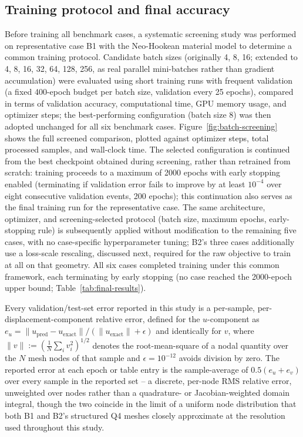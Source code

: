 \documentclass[final,5p,times]{elsarticle}
\begin{document}
\subsection{Training protocol and final accuracy}
Before training all benchmark cases, a systematic screening study was
performed on representative case B1 with the Neo-Hookean material model
to determine a common training protocol. Candidate batch sizes
(originally 4, 8, 16; extended to 4, 8, 16, 32, 64, 128, 256, as real
parallel mini-batches rather than gradient accumulation) were evaluated
using short training runs with frequent validation (a fixed 400-epoch
budget per batch size, validation every 25 epochs), compared in terms of
validation accuracy, computational time, GPU memory usage, and optimizer
steps; the best-performing configuration (batch size 8) was then adopted
unchanged for all six benchmark cases.
Figure~\ref{fig:batch-screening} shows the full screened comparison,
plotted against optimizer steps, total processed samples, and wall-clock
time. The selected configuration is continued from the best checkpoint
obtained during screening, rather than retrained from scratch: training
proceeds to a maximum of 2000 epochs with early stopping enabled
(terminating if validation error fails to improve by at least $10^{-4}$
over eight consecutive validation events, 200 epochs); this continuation
also serves as the final training run for the representative case. The
same architecture, optimizer, and screening-selected protocol (batch
size, maximum epochs, early-stopping rule) is subsequently applied
without modification to the remaining five cases, with no case-specific
hyperparameter tuning; B2's three cases additionally use a loss-scale
rescaling, discussed next, required for the raw objective to train at
all on that geometry. All six cases completed
training under this common framework, each terminating by early stopping
(no case reached the 2000-epoch upper bound; Table~\ref{tab:final-results}).

Every validation/test-set error reported in this study is a per-sample,
per-displacement-component relative error, defined for the $u$-component
as $e_u = \|u_{\text{pred}}-u_{\text{exact}}\|/(\|u_{\text{exact}}\|+\epsilon)$
and identically for $v$, where $\|v\| := (\tfrac1N\sum_i v_i^2)^{1/2}$
denotes the root-mean-square of a nodal quantity over the $N$ mesh nodes
of that sample and $\epsilon=10^{-12}$ avoids division by zero. The
reported error at each epoch or table entry is the sample-average of
$0.5(e_u+e_v)$ over every sample in the reported set -- a discrete,
per-node RMS relative error, unweighted over nodes rather than a
quadrature- or Jacobian-weighted domain integral, though the two coincide
in the limit of a uniform node distribution that both B1 and B2's
structured Q4 meshes closely approximate at the resolution used
throughout this study.
\end{document}
